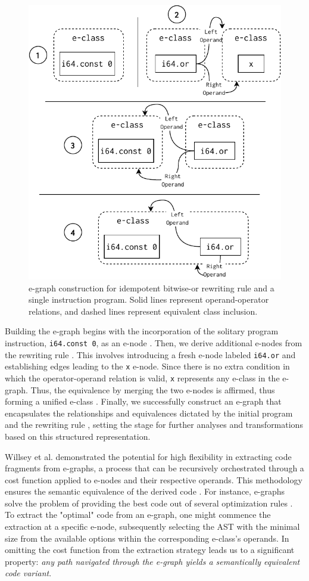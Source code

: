 \begin{figure}
  \centering
  \includegraphics[width=0.7\linewidth]{figures/egraph1.pdf}
  \caption{e-graph construction for idempotent bitwise-or rewriting rule and a single instruction \wasm program. Solid lines represent operand-operator relations, and dashed lines represent equivalent class inclusion. }
\label{e-graph}
\end{figure}

Building the e-graph begins with the incorporation of the solitary program instruction, \texttt{i64.const 0}, as an e-node .
Then, we derive additional e-nodes from the rewriting rule . 
This involves introducing a fresh e-node labeled \texttt{i64.or} and establishing edges leading to the \texttt{x} e-node.
Since there is no extra condition in which the operator-operand relation is valid, \texttt{x} represents any e-class in the e-graph.
Thus, the equivalence by merging the two e-nodes is affirmed, thus forming a unified e-class . 
Finally, we successfully construct an e-graph that encapsulates the relationships and equivalences dictated by the initial program and the rewriting rule , setting the stage for further analyses and transformations based on this structured representation.

\label{traversal}

Willsey et al. demonstrated the potential for high flexibility in extracting code fragments from e-graphs, a process that can be recursively orchestrated through a cost function applied to e-nodes and their respective operands.
This methodology ensures the semantic equivalence of the derived code \cite{e-graph}. 
For instance, e-graphs solve the problem of providing the best code out of several optimization rules \cite{optimization order problem}.
To extract the "optimal" code from an e-graph, one might commence the extraction at a specific e-node, subsequently selecting the AST with the minimal size from the available options within the corresponding e-class's operands.
In \too omitting the cost function from the extraction strategy leads us to a significant property: \emph{any path navigated through the e-graph yields a semantically equivalent code variant}. 

